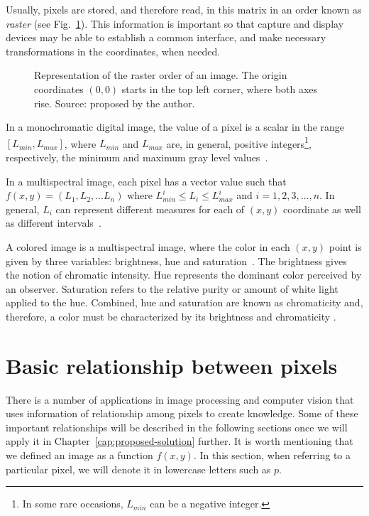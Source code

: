 Usually, pixels are stored, and therefore read, in this matrix in an order known as \textit{raster} (see Fig.~\ref{fig:raster}). This information is important so that capture and display devices may be able to establish a common interface, and make necessary transformations in the coordinates, when needed.

\begin{figure}[ht]
    \centering

    \caption[Representation of the raster order of an image]{Representation of the raster order of an image. The origin coordinates $(0, 0)$ starts in the top left corner, where both axes rise. Source: proposed by the author.}
    \label{fig:raster}
\end{figure}


In a monochromatic digital image, the value of a pixel is a scalar in the range $[L_{min}, L_{max}]$, where $L_{min}$ and $L_{max}$ are, in general, positive integers\footnote{In some rare occasions, $L_{min}$ can be a negative integer.}, respectively, the minimum and maximum gray level values~\citep{pedrini:08}.

In a multispectral image, each pixel has a vector value such that $f(x, y) = (L_1, L_2, \ldots L_n)$ where $L^i_{min} \leq L_i \leq L^i_{max}$ and $i = 1, 2, 3, \ldots, n$. In general, $L_i$ can represent different measures for each of $(x, y)$ coordinate as well as different intervals~\citep{pedrini:08}.

A colored image is a multispectral image, where the color in each $(x, y)$ point is given by three variables: brightness, hue and saturation~\citep{pedrini:08}. The brightness gives the notion of chromatic intensity. Hue represents the dominant color perceived by an observer. Saturation refers to the relative purity or amount of white light applied to the hue. Combined, hue and saturation are known as chromaticity and, therefore, a color must be characterized by its brightness and chromaticity \citep{gonzalez:02}.


\section{Basic relationship between pixels}
\label{sec:image_components_relation}
There is a number of applications in image processing and computer vision that uses information of relationship among pixels to create knowledge. Some of these important relationships will be described in the following sections once we will apply it in Chapter~\ref{cap:proposed-solution} further. It is worth mentioning that we defined an image as a function $f(x, y)$. In this section, when referring to a particular pixel, we will denote it in lowercase letters such as $p$.


